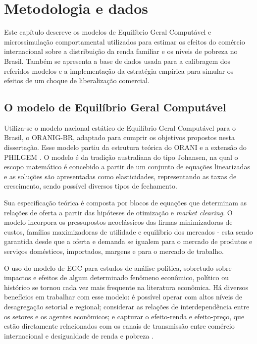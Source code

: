 

\chapter{Metodologia e dados} \label{cha:metodologia}

Este capítulo descreve os modelos de Equilíbrio Geral Computável e microssimulação comportamental utilizados para estimar os efeitos do comércio internacional sobre a distribuição da renda familiar e os níveis de pobreza no Brasil. Também se apresenta a base de dados usada para a calibragem dos referidos modelos e a implementação da estratégia empírica para simular os efeitos de um choque de liberalização comercial.


\section{O modelo de Equilíbrio Geral Computável} \label{sec:egc}

Utiliza-se o modelo nacional estático de Equilíbrio Geral Computável para o Brasil, o ORANIG-BR, adaptado para cumprir os objetivos propostos nesta dissertação. Esse modelo partiu da estrutura teórica do ORANI \cite{dixit80} e a extensão do PHILGEM \cite{corong12, corong14}. O modelo é da tradição australiana do tipo Johansen, na qual o escopo matemático é concebido a partir de um conjunto de equações linearizadas e as soluções são apresentadas como elasticidades, representando as taxas de crescimento, sendo possível diversos tipos de fechamento.

Sua especificação teórica é composta por blocos de equações que determinam as relações de oferta a partir das hipóteses de otimização e \textit{market clearing}. O modelo incorpora os pressupostos neoclássicos das firmas minimizadoras de custos, famílias maximizadoras de utilidade e equilíbrio dos mercados - esta sendo garantida desde que a oferta e demanda se igualem para o mercado de produtos e serviços domésticos, importados, margens e para o mercado de trabalho.

O uso do modelo de EGC para estudos de análise política, sobretudo sobre impactos e efeitos de algum determinado fenômeno econômico, político ou histórico se tornou cada vez mais frequente na literatura econômica. Há diversos benefícios em trabalhar com esse modelo: é possível operar com altos níveis de desagregação setorial e regional; considerar as relações de interdependência entre os setores e os agentes econômicos; e capturar o efeito-renda e efeito-preço, que estão diretamente relacionados com os canais de transmissão entre comércio internacional e desigualdade de renda e pobreza \cite{anderson20}.

